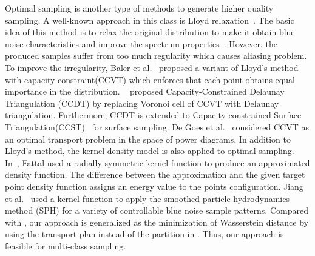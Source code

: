 Optimal sampling is another type of methods to generate higher quality sampling.
A well-known approach in this class is Lloyd relaxation~\cite{lloyd:1982:least}.
The basic idea of this method
is to relax the original distribution to make it obtain blue noise
characteristics and improve the spectrum properties~\cite{mccool:1992:hierarchical}.
However, the produced samples suffer from too much regularity which causes aliasing problem.
To improve the irregularity,
Baler et al.~ proposed a variant of Lloyd's method with capacity constraint(CCVT)
which enforces that each point obtains equal importance in the distribution.
~\cite{xu:2011:capacity} proposed Capacity-Constrained Delaunay Triangulation (CCDT) by replacing Voronoi cell of CCVT with Delaunay triangulation.
Furthermore, CCDT is extended to Capacity-constrained Surface Triangulation(CCST)~\cite{xu:2012:blue} for surface sampling.
De Goes et al.~\cite{de:2012:blue} considered CCVT as an optimal transport problem in
the space of power diagrams.
In addition to Lloyd's method,
the kernel density model is also applied to optimal sampling.
In~\cite{fattal:2011:blue},
Fattal used a radially-symmetric kernel function to produce an approximated density function.
The difference between the approximation and the given target point density function assigns an energy value to the points configuration.
Jiang et al.~ used a kernel function to apply the smoothed particle hydrodynamics method  (SPH) for a variety of controllable blue noise sample patterns.
Compared with \cite{de:2012:blue},
our approach is generalized as the minimization of Wasserstein distance
by using the transport plan instead of the partition in \cite{de:2012:blue}.
Thus, our approach is feasible for multi-class sampling.


